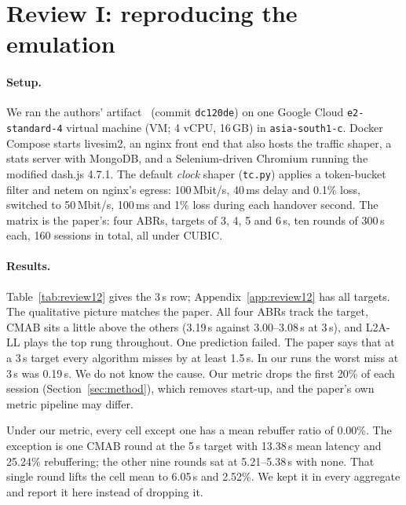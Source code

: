 \documentclass[sigconf]{acmart}
\begin{document}
\section{Review I: reproducing the emulation}
\label{sec:repro}

\paragraph{Setup.} We ran the authors' artifact~\cite{zhao2024artifact} (commit \texttt{dc120de}) on one Google Cloud \texttt{e2-standard-4} virtual machine (VM; 4 vCPU, 16\,GB) in \texttt{asia-south1-c}. Docker Compose starts livesim2, an nginx front end that also hosts the traffic shaper, a stats server with MongoDB, and a Selenium-driven Chromium running the modified dash.js 4.7.1. The default \emph{clock} shaper (\texttt{tc.py}) applies a token-bucket filter and netem on nginx's egress: 100\,Mbit/s, 40\,ms delay and 0.1\% loss, switched to 50\,Mbit/s, 100\,ms and 1\% loss during each handover second. The matrix is the paper's: four ABRs, targets of 3, 4, 5 and 6\,s, ten rounds of 300\,s each, 160 sessions in total, all under CUBIC.

\paragraph{Results.} Table~\ref{tab:review12} gives the 3\,s row; Appendix~\ref{app:review12} has all targets. The qualitative picture matches the paper. All four ABRs track the target, CMAB sits a little above the others (3.19\,s against 3.00--3.08\,s at 3\,s), and L2A-LL plays the top rung throughout. One prediction failed. The paper says that at a 3\,s target every algorithm misses by at least 1.5\,s. In our runs the worst miss at 3\,s was 0.19\,s. We do not know the cause. Our metric drops the first 20\% of each session (Section~\ref{sec:method}), which removes start-up, and the paper's own metric pipeline may differ.

Under our metric, every cell except one has a mean rebuffer ratio of 0.00\%. The exception is one CMAB round at the 5\,s target with 13.38\,s mean latency and 25.24\% rebuffering; the other nine rounds sat at 5.21--5.38\,s with none. That single round lifts the cell mean to 6.05\,s and 2.52\%. We kept it in every aggregate and report it here instead of dropping it.
\end{document}
